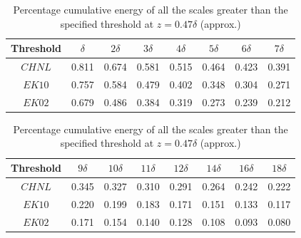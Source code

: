 \documentclass{amsart}
\begin{document}
\begin{table}[!htb]
\centering
\caption{Percentage cumulative energy of all the scales greater than the specified threshold at $z=0.47\delta$ (approx.)}
\begin{tabular*}{0.9\textwidth}{ c@{\hskip 0.35in} c@{\hskip 0.35in} c@{\hskip 0.35in} c@{\hskip 0.35in} c@{\hskip 0.35in} c@{\hskip 0.35in} c@{\hskip 0.3in} c@{\hskip 0.3in} }
\hline
\hline
 Threshold & $\delta$ & $2\delta$ & $3\delta$ & $4\delta$ & $5\delta$ & $6\delta$  & $7\delta$  \\ %
\hline 
$CHNL$ & 0.811 & 0.674 & 0.581 & 0.515 & 0.464 & 0.423 &  0.391  \\ %
$EK10$ & 0.757 & 0.584 & 0.479 & 0.402 & 0.348 & 0.304 & 0.271   \\ %
$EK02$ & 0.679 & 0.486 & 0.384 & 0.319 & 0.273 & 0.239 & 0.212   \\ %
\end{tabular*}
\label{tab:prcnt_cum_energy}
%
\begin{tabular*}{0.9\textwidth}{c@{\hskip 0.35in} c@{\hskip 0.35in} c@{\hskip 0.35in} c@{\hskip 0.35in} c@{\hskip 0.350in} c@{\hskip 0.350in}  c@{\hskip 0.35in} c}
\hline

 Threshold & $9\delta$& $10\delta$ & $11\delta$ & $12\delta$ & $14\delta$ & $16\delta$ & $18\delta$ \\
\hline 
$CHNL$ & 0.345 & 0.327 & 0.310 & 0.291 & 0.264 & 0.242 & 0.222 \\
$EK10$ & 0.220 & 0.199 & 0.183  & 0.171 & 0.151 & 0.133 & 0.117 \\
$EK02$ & 0.171 & 0.154 & 0.140 & 0.128 & 0.108 & 0.093 & 0.080 \\
\hline 
\hline 
\end{tabular*}
\end{table}
\end{document}
